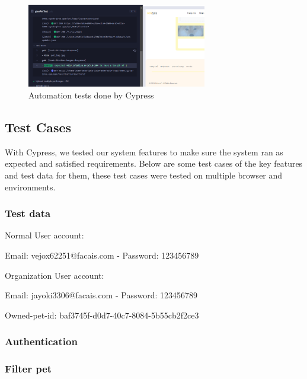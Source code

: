 \begin{figure}[H]
    \centering
    \includegraphics[width=0.7\textwidth]{Figures/cypress_auto.png}
    \caption{Automation tests done by Cypress}
    \label{fig:cypress-test}
\end{figure}

\subsection{Test Cases}
With Cypress, we tested our system features to make sure the system ran as expected and satisfied requirements. Below are some test cases of the key features and test data for them, these test cases were tested on multiple browser and environments.

\subsubsection*{Test data}

Normal User account:

\quad Email: vejox62251@facais.com - Password: 123456789

Organization User account:

\quad Email:  jayoki3306@facais.com - Password: 123456789

Owned-pet-id: baf3745f-d0d7-40c7-8084-5b55cb2f2ce3

\subsubsection*{Authentication}









\subsubsection*{Filter pet}

